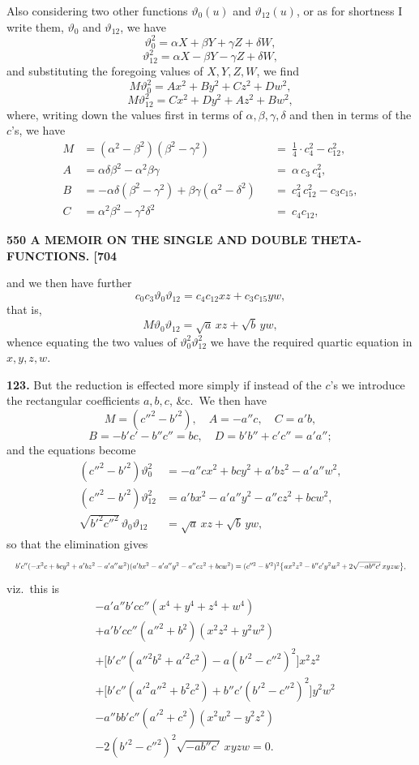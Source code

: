 \documentclass[11pt]{article}
\begin{document}
Also considering two other functions $\vartheta_0(u)$ and $\vartheta_{12}(u)$, or as for shortness I write them, $\vartheta_0$ and $\vartheta_{12}$, we have
\[
\vartheta_0^2 = \alpha X + \beta Y + \gamma Z + \delta W,
\]
\[
\vartheta_{12}^2 = \alpha X - \beta Y - \gamma Z + \delta W,
\]
and substituting the foregoing values of $X, Y, Z, W$, we find
\[
M\vartheta_0^2 = Ax^2 + By^2 + Cz^2 + Dw^2,
\]
\[
M\vartheta_{12}^2 = Cx^2 + Dy^2 + Az^2 + Bw^2,
\]
where, writing down the values first in terms of $\alpha,\beta,\gamma,\delta$ and then in terms of the $c$'s, we have
\[
\begin{aligned}
M &= (\alpha^2 - \beta^2)(\beta^2 - \gamma^2) &&=\ \tfrac{1}{4}\cdot c_4^2 - c_{12}^2,\\
A &= \alpha\delta\beta^2 - \alpha^2\beta\gamma &&=\ \alpha\,c_3\,c_4^2,\\
B &= -\alpha\delta(\beta^2 - \gamma^2) + \beta\gamma(\alpha^2 - \delta^2) &&=\ c_4^2\,c_{12}^2 - c_3c_{15},\\
C &= \alpha^2\beta^2 - \gamma^2\delta^2 &&=\ c_4c_{12},
\end{aligned}
\]

\newpage
\noindent\textbf{550 \hfill A MEMOIR ON THE SINGLE AND DOUBLE THETA-FUNCTIONS. \hfill [704}

\medskip
and we then have further
\[
c_0c_3\vartheta_0\vartheta_{12} = c_4c_{12}xz + c_3c_{15}yw,
\]
that is,
\[
M\vartheta_0\vartheta_{12} = \sqrt{a}\,xz + \sqrt{b}\,yw,
\]
whence equating the two values of $\vartheta_0^2\vartheta_{12}^2$ we have the required quartic equation in $x, y, z, w$.

\medskip
\textbf{123.} But the reduction is effected more simply if instead of the $c$'s we introduce the rectangular coefficients $a, b, c$, \&c.\ We then have
\[
M = (c''^2 - b'^2),\quad A = -a''c,\quad C = a'b,
\]
\[
B = -b'c' - b''c'' = bc,\quad D = b'b'' + c'c'' = a'a'';
\]
and the equations become
\[
\begin{aligned}
(c''^2 - b'^2)\vartheta_0^2 &= -a''cx^2 + bcy^2 + a'bz^2 - a'a''w^2,\\
(c''^2 - b'^2)\vartheta_{12}^2 &= a'bx^2 - a'a''y^2 - a''cz^2 + bcw^2,\\
\sqrt{b'^2c''^2}\,\vartheta_0\vartheta_{12} &= \sqrt{a}\,xz + \sqrt{b}\,yw,
\end{aligned}
\]
so that the elimination gives
\[
\resizebox{\textwidth}{!}{$\displaystyle
b'c''(-x^2c + bcy^2 + a'bz^2 - a'a''w^2)(a'bx^2 - a'a''y^2 - a''cz^2 + bcw^2) = (c''^2 - b'^2)^2\bigl\{ax^2z^2 - b''c'y^2w^2 + 2\sqrt{-a b''c'}\,xyzw\bigr\},
$}
\]
viz.\ this is
\[
\begin{aligned}
& -a'a''b'cc''(x^4 + y^4 + z^4 + w^4)\\
& + a'b'cc''(a''^2 + b^2)(x^2z^2 + y^2w^2)\\
& + \bigl[b'c''(a''^2b^2 + a'^2c^2) - a(b'^2 - c''^2)^2\bigr]x^2z^2\\
& + \bigl[b'c''(a'^2a''^2 + b^2c^2) + b''c'(b'^2 - c''^2)^2\bigr]y^2w^2\\
& - a''bb'c''(a'^2 + c^2)(x^2w^2 - y^2z^2)\\
& - 2(b'^2 - c''^2)^2\sqrt{-ab''c'}\,xyzw = 0.
\end{aligned}
\]
\end{document}
